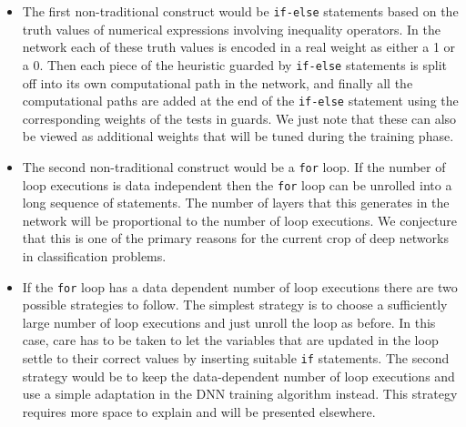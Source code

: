 \documentclass{article}
\begin{document}
\begin{itemize}
\item The first non-traditional construct would be \texttt{if-else} statements based on the truth values of numerical expressions involving inequality operators. In the network each of these truth values is encoded in a real weight as either a 1 or a 0. Then each piece of the heuristic guarded by \texttt{if-else} statements is split off into its own computational path in the network, and finally all the computational paths are added at the end of the \texttt{if-else} statement using the corresponding weights of the tests in guards. We just note that these can also be viewed as additional weights that will be tuned during the training phase.

\item The second non-traditional construct would be a \texttt{for} loop. If the number of loop executions is data independent then the \texttt{for} loop can be unrolled into a long sequence of statements. The number of layers that this generates in the network will be proportional to the number of loop executions. We conjecture that this is one of the primary reasons for the current crop of deep networks in classification problems.

\item If the \texttt{for} loop has a data dependent number of loop executions there are two possible strategies to follow. The simplest strategy is to choose a sufficiently large number of loop executions and just unroll the loop as before. In this case, care has to be taken to let the variables that are updated in the loop settle to their correct values by inserting suitable \texttt{if} statements. The second strategy would be to keep the data-dependent number of loop executions and use a simple adaptation in the DNN training algorithm instead. This strategy requires more space to explain and will be presented elsewhere.
\end{itemize}

\end{document}
